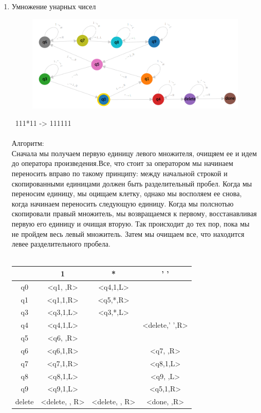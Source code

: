 \documentclass{article}
\begin{document}
\begin{enumerate}
    \item Умножение унарных чисел
        \begin{figure}[h]
        \centering
        \includegraphics[width=14cm]{pictures/1.2.png}
    \end{figure}
    
\ 111*11 -> 111111\\
\\
Алгоритм:\\
Сначала мы получаем первую единицу левого множителя, очищяем ее и идем до оператора произведения.Все, что стоит за оператором мы начинаем переносить вправо по такому принципу: между начальной строкой и скопированными единицами должен быть разделительный пробел. Когда мы переносим единицу, мы оцищаем клетку, однако мы восполяем ее снова, когда начинаем переносить следующую единицу. Когда мы полснотью скопировали правый множитель, мы возвращаемся к первому, восстанавливая первую его единицу и очищая вторую. Так происходит до тех пор, пока мы не пройдем весь левый множитель. Затем мы очищаем все, что находится левее разделительного пробела. \\
\\
\begin{tabular}{|*{4}{c|}}
\hline
\textbf{ } & 1 & * & ' '\\
\hline\hline
q0 & <q1, ,R> & <q4,1,L> & \\
\hline\hline
q1 & <q1,1,R> & <q5,*,R> & \\
\hline\hline
q3 & <q3,1,L> & <q3,*,L> &\\
\hline\hline
q4 & <q4,1,L> & & <delete,' ',R>\\
\hline\hline
q5 & <q6, ,R> & &\\
\hline\hline
q6 & <q6,1,R> & & <q7, ,R> \\
\hline\hline
q7 & <q7,1,R> & & <q8,1,L> \\
\hline\hline
q8 & <q8,1,L> &  & <q9, ,L> \\
\hline\hline
q9 & <q9,1,L> & & <q5,1,R> \\
\hline\hline
delete & <delete, , R> & <delete, , R> & <done, ,R>\\
\hline
\end{tabular}
\end{enumerate} \\ \\
\\ \\ 
\end{document}
